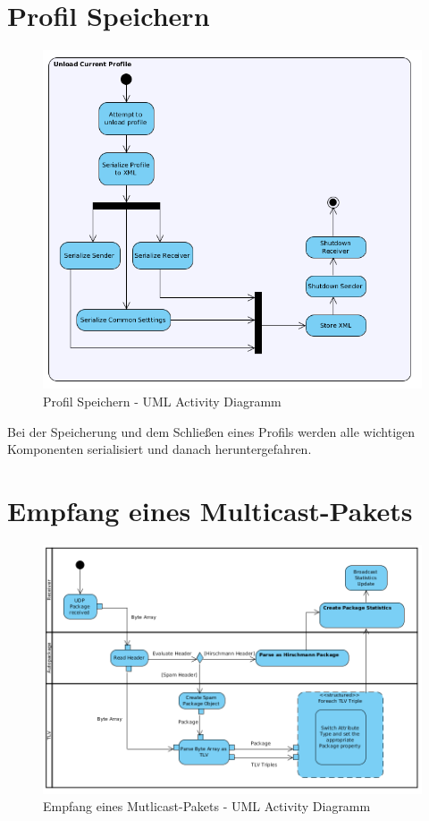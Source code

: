 \section{Profil Speichern}
\label{sec:5:loadprofile}
\begin{figure}[H]
\includegraphics[width=15cm]{images/UnloadProfile.png}
\centering
\caption{Profil Speichern - UML Activity Diagramm}
\label{fig_unloadprofile}
\end{figure}

Bei der Speicherung und dem Schließen eines Profils werden alle 
wichtigen Komponenten serialisiert und danach heruntergefahren.

\section{Empfang eines Multicast-Pakets}
\label{sec:5:recmc}
\begin{figure}[H]
\includegraphics[width=15cm]{images/Receive.png}
\centering
\caption{Empfang eines Mutlicast-Pakets - UML Activity Diagramm}
\label{fig_receive}
\end{figure}

